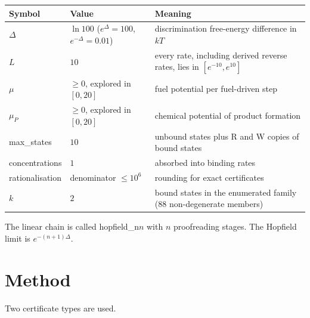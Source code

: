 \documentclass[11pt]{article}
\theoremstyle{definition}\newtheorem{definition}[theorem]{Definition}\newtheorem{example}[theorem]{Example}
\begin{document}
{\def\LTcaptype{none} %
\begin{longtable}[]{@{}
  >{\raggedright\arraybackslash}p{}
  >{\raggedright\arraybackslash}p{}
  >{\raggedright\arraybackslash}p{}@{}}
\toprule\noalign{}
\begin{minipage}[b]{\linewidth}\raggedright
Symbol
\end{minipage} & \begin{minipage}[b]{\linewidth}\raggedright
Value
\end{minipage} & \begin{minipage}[b]{\linewidth}\raggedright
Meaning
\end{minipage} \\
\midrule\noalign{}
\endhead
\bottomrule\noalign{}
\endlastfoot
\(\Delta\) & \(\ln 100\) (\(e^{\Delta}=100\), \(e^{-\Delta}=0.01\)) & discrimination free-energy difference in \(kT\) \\
\(L\) & \(10\) & every rate, including derived reverse rates, lies in \([e^{-10},e^{10}]\) \\
\(\mu\) & \(\ge 0\), explored in \([0,20]\) & fuel potential per fuel-driven step \\
\(\mu_P\) & \(\ge 0\), explored in \([0,20]\) & chemical potential of product formation \\
max\_states & \(10\) & unbound states plus R and W copies of bound states \\
concentrations & \(1\) & absorbed into binding rates \\
rationalisation & denominator \(\le 10^{6}\) & rounding for exact certificates \\
\(k\) & \(2\) & bound states in the enumerated family (88 non-degenerate members) \\
\end{longtable}
}

The linear chain is called hopfield\_n\(n\) with \(n\) proofreading stages. The Hopfield limit is \(e^{-(n+1)\Delta}\).

\section{Method}\label{method}

Two certificate types are used.
\end{document}
